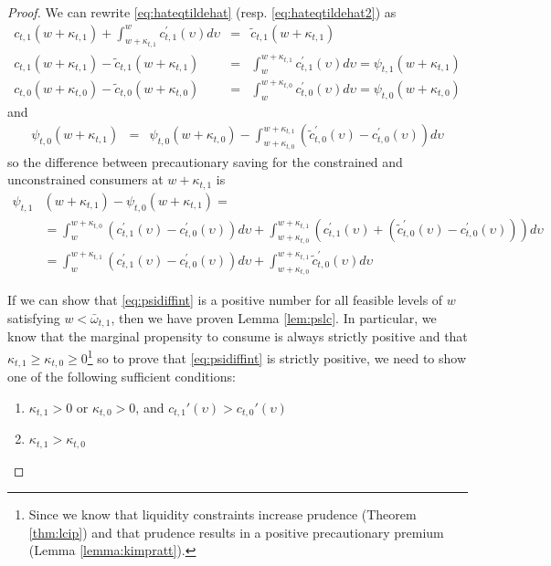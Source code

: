 \documentclass[titlepage]{\econtex}
\providecommand{\wAlt}{\omega}
\begin{document}
\begin{proof}
We can rewrite \eqref{eq:hateqtildehat} (resp. \eqref{eq:hateqtildehat2}) as
\begin{eqnarray*}
c_{t,1}({w}+\kappa_{t,1})+\int_{{w}+\kappa_{t,1}}^{{w}} c_{t,1}^{\prime}(\upsilon) d\upsilon & = & \tilde{c}_{t,1}({w}+\kappa_{t,1})
\\ %
c_{t,1}({w}+\kappa_{t,1})-\tilde{c}_{t,1}({w}+\kappa_{t,1}) & = & 
\int^{{w}+\kappa_{t,1}}_{{w}} c_{t,1}^{\prime}(\upsilon) d\upsilon = \psi_{t,1}({w}+\kappa_{t,1})
\\ %
c_{t,0}({w}+\kappa_{t,0})-\tilde{c}_{t,0}({w}+\kappa_{t,0})
& = & 
\int^{{w}+\kappa_{t,0}}_{{w}} c_{t,0}^{\prime}(\upsilon) d\upsilon  = \psi_{t,0}({w}+\kappa_{t,0})
\end{eqnarray*}
and 
\begin{eqnarray}
 \psi_{t,0}({w}+\kappa_{t,1}) & = & 
 \psi_{t,0}({w}+\kappa_{t,0}) - \int^{{w}+\kappa_{t,1}}_{{w}+\kappa_{t,0}} (\tilde{c}_{t,0}^{\prime}(\upsilon)-c_{t,0}^{\prime}(\upsilon)) d\upsilon \nonumber
\end{eqnarray}
so the difference between precautionary saving for the constrained and 
unconstrained consumers at ${w}+\kappa_{t,1}$ is 
\begin{align}
\psi_{t,1}&({w}+\kappa_{t,1}) - \psi_{t,0}({w}+\kappa_{t,1}) = \nonumber\\ &=\int_{{w}}^{{w}+\kappa_{t,0}} (c_{t,1}^{\prime}(\upsilon)-c_{t,0}^{\prime}(\upsilon))d\upsilon+\int^{{w}+\kappa_{t,1}}_{{w}+\kappa_{t,0}} \left(c_{t,1}^{\prime}(\upsilon)+(\tilde{c}_{t,0}^{\prime}(\upsilon)-c_{t,0}^{\prime}(\upsilon)) \right) d\upsilon \nonumber \\
&= \int_{{w}}^{{w}+\kappa_{t,1}}
(c_{t,1}^{\prime}(\upsilon)-c_{t,0}^{\prime}(\upsilon))d\upsilon +\int^{{w}+\kappa_{t,1}}_{{w}+\kappa_{t,0}}
\tilde{c}_{t,0}^{\prime}(\upsilon) d\upsilon \label{eq:psidiffint}
\end{align}


If we can show that \eqref{eq:psidiffint} is a positive
number for all feasible levels of ${w}$ satisfying ${w} < {\bar{\wAlt}}_{t,1}$, then we have proven Lemma \ref{lem:pslc}. In particular, we know that the marginal propensity to consume is always strictly positive and that $\kappa_{t,1} \geq \kappa_{t,0} \geq 0$\footnote{Since we know that liquidity constraints increase prudence (Theorem \ref{thm:lcip}) and that prudence results in a positive precautionary premium (Lemma \ref{lemma:kimpratt}).} so to prove that \eqref{eq:psidiffint} is strictly positive, we need to show one of the following sufficient conditions:
\begin{enumerate}
	\item $\kappa_{t,1} > 0$ or $\kappa_{t,0} > 0$, and $c_{t,1}'(\upsilon) > c_{t,0}'(\upsilon)$
	\item $\kappa_{t,1} > \kappa_{t,0}$
\end{enumerate}


\end{proof}
\end{document}

